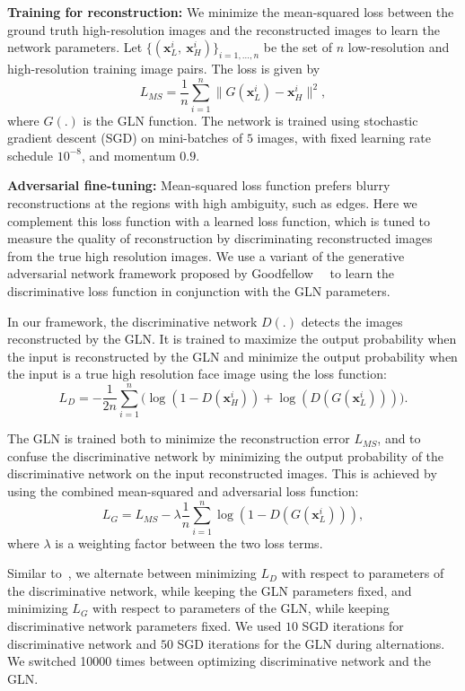 \documentclass[runningheads]{llncs}
\begin{document}
{\bf Training for reconstruction:}
We minimize the mean-squared loss between the ground truth high-resolution images and the reconstructed images to learn the network parameters. Let $\{(\mathbf{x}_L^i , \ \mathbf{x}_H^i)\}_{i=1,\ldots,n}$ be the set of $n$ low-resolution and high-resolution training image pairs. The loss is given by
\begin{equation}
 L_{MS} = \frac{1}{n} \sum_{i=1}^n \|G(\mathbf{x}_L^i) -  \mathbf{x}_H^i\|^2,
\end{equation}
where $G(.)$ is the GLN function. The network is trained using stochastic gradient descent (SGD) on mini-batches of $5$ images, with fixed learning rate schedule $10^{-8}$, and momentum $0.9$.


{\bf Adversarial fine-tuning:}
Mean-squared loss function prefers blurry reconstructions at the regions with high ambiguity, such as edges. Here we complement this loss function with a learned loss function, which is tuned to measure the quality of reconstruction by discriminating reconstructed images from the true high resolution images. We use a variant of the generative adversarial network framework proposed by Goodfellow~\etal~\cite{Goodfellow14} to learn the discriminative loss function in conjunction with the GLN parameters.

In our framework, the discriminative network $D(.)$ detects the images reconstructed by the GLN. It is trained to maximize the output probability when the input is reconstructed by the GLN and minimize the output probability when the input is a true high resolution face image using the loss function:
\begin{equation} \label{eq:discriminator}
 L_{D} = -\frac{1}{2n} \sum_{i=1}^n \big( \log (1 - D(\mathbf{x}_H^i)) + \log (D(G(\mathbf{x}_L^i))) \big).
\end{equation}

The GLN is trained both to minimize the reconstruction error $L_{MS}$, and to confuse the discriminative network by minimizing the output probability of the discriminative network on the input reconstructed images. This is achieved by using the combined mean-squared and adversarial loss function:
\begin{equation} \label{eq:generator}
 L_{G} =  L_{MS} - \lambda \frac{1}{n} \sum_{i=1}^n \log (1 - D(G(\mathbf{x}_L^i))),
\end{equation}
where $\lambda$ is a weighting factor between the two loss terms.

Similar to~\cite{Goodfellow14}, we alternate between minimizing $L_D$ with respect to parameters of the discriminative network, while keeping the GLN parameters fixed, and minimizing $L_G$ with respect to parameters of the GLN, while keeping discriminative network parameters fixed. We used $10$ SGD iterations for discriminative network and $50$ SGD iterations for the GLN during alternations. We switched 10000 times between optimizing discriminative network and the GLN.
\end{document}
